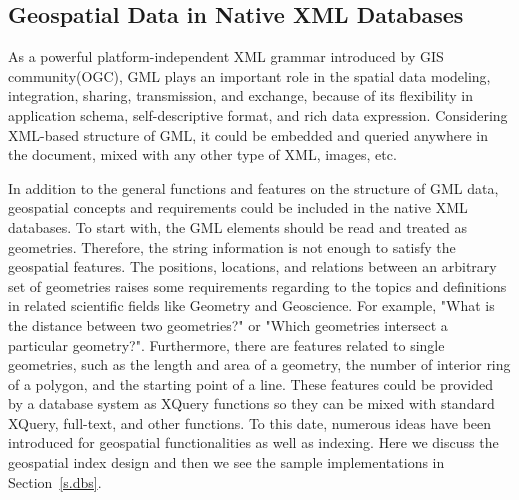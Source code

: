 \documentclass[a4paper,12pt]{article}
\begin{document}
\subsection{Geospatial Data in Native XML Databases}
\label{s.geo-data-in-xml-data}
As a powerful platform-independent XML grammar introduced by GIS community(OGC), GML plays an important role in the spatial data modeling, integration, sharing, transmission, and exchange, because of its flexibility in application schema, self-descriptive format, and rich data expression. Considering XML-based structure of GML, it could be embedded and queried anywhere in the document, mixed with any other type of XML, images, etc. 

In addition to the general functions and features on the structure of GML data, geospatial concepts and requirements could be included in the native XML databases. To start with, the GML elements should be read and treated as geometries. Therefore, the string information is not enough to satisfy the geospatial features. The positions, locations, and relations between an arbitrary set of geometries raises some requirements regarding to the topics and definitions in related scientific fields like Geometry and Geoscience. For example, "What is the distance between two geometries?" or "Which geometries intersect a particular geometry?". Furthermore, there are features related to single geometries, such as the length and area of a geometry, the number of interior ring of a polygon, and the starting point of a line. These features could be provided by a database system as XQuery functions so they can be mixed with standard XQuery, full-text, and other functions.
To this date, numerous ideas have been introduced for geospatial functionalities as well as indexing. Here we discuss the geospatial index design and then we see the sample implementations in Section~\ref{s.dbs}.


\end{document}

